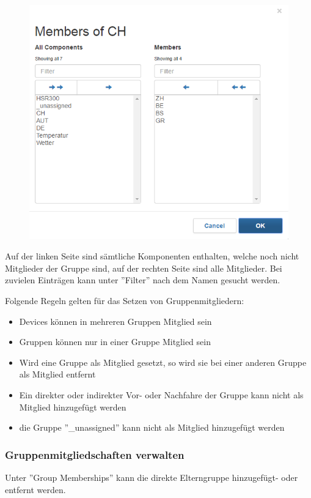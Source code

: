 \begin{figure}[H]
\includegraphics[scale=0.65]{../05_Schlussbericht/images/benutzeranleitung/gruppenmitglieder.png}
\end{figure}

Auf der linken Seite sind sämtliche Komponenten enthalten, welche noch nicht Mitglieder der Gruppe sind, auf der rechten Seite sind alle Mitglieder. Bei zuvielen Einträgen kann unter ''Filter'' nach dem Namen gesucht werden. 

Folgende Regeln gelten für das Setzen von Gruppenmitgliedern:
\begin{itemize}
\item Devices können in mehreren Gruppen Mitglied sein
\item Gruppen können nur in einer Gruppe Mitglied sein
\item Wird eine Gruppe als Mitglied gesetzt, so wird sie bei einer anderen Gruppe als Mitglied entfernt
\item Ein direkter oder indirekter Vor- oder Nachfahre der Gruppe kann nicht als Mitglied hinzugefügt werden
\item die Gruppe ''\_unassigned'' kann nicht als Mitglied hinzugefügt werden
\end{itemize}

\subsubsection{Gruppenmitgliedschaften verwalten}
Unter ''Group Memberships'' kann die direkte Elterngruppe hinzugefügt- oder entfernt werden.

